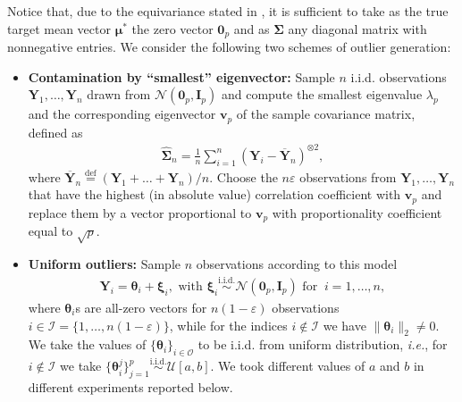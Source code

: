 \documentclass[aos,preprint,reqno]{imsart}
\newcommand\bmu{\boldsymbol\mu}
\newcommand\bxi{\boldsymbol\xi}
\newcommand\bSigma{\boldsymbol\Sigma}
\newcommand\bY{\boldsymbol Y}
\newcommand\bv{\boldsymbol v}
\newcommand\bfI{\mathbf I}
\newcommand\btheta{\boldsymbol\theta}
\theoremstyle{plain}
\theoremstyle{remark}
\begin{document}
    Notice that, due to the equivariance stated in 
    , it is sufficient to take as the true 
    target mean vector $\bmu^*$ the zero vector 
    $\mathbf{0}_p$ and as $\bSigma$ any  diagonal matrix 
    with nonnegative entries.  We consider the following 
    two schemes of outlier generation:
    \begin{itemize}
    \item {\textbf{Contamination by ``smallest'' eigenvector:}} Sample $n$ i.i.d. observations $\bY_1, \dots, \bY_n$ drawn from  $\mathcal{N}(\mathbf{0}_p, \bfI_p)$ and compute the smallest eigenvalue $\lambda_p$ and the corresponding eigenvector $\bv_p$ of the sample covariance matrix, defined as
    \begin{align}
        \widehat{\bSigma}_n = \frac 1 n \sum_{i=1}^n (\bY_i - 
        \overline{\bY}_n)^{\otimes 2},
    \end{align}
    where $\overline{\bY}_n \stackrel{\text{def}}{=} (\bY_1 + \dots + \bY_n) / n$. Choose the  ${n \varepsilon}$ observations from $\bY_1, \dots, \bY_n$ that have the highest (in absolute value) correlation coefficient with $\bv_p$ and replace them by a vector proportional to $\bv_p$ with proportionality coefficient equal to $\sqrt{p}$.
    \item \textbf{Uniform outliers:} Sample $n$ observations according to this model 
    \begin{align}
        \bY_i = \btheta_i + \bxi_i, \text{ with } \bxi_i \stackrel{\text{i.i.d.}}{\sim} \mathcal{N}(\mathbf{0}_p, \bfI_p) \text{ for } ~ i = 1, \dots, n,
    \end{align}
    where $\btheta_i$s are all-zero vectors for $n(1-\varepsilon)$ observations $i \in \mathcal I = \{1,\ldots,n (1 - \varepsilon)\}$, while for the indices $i \not\in \mathcal{I}$ we have $\| \btheta_i \|_2 \neq 0$. We take the values of $\{\btheta_i\}_{i\in\mathcal{O}}$ to be i.i.d. from uniform distribution, \textit{i.e.}, for $i \not\in \mathcal{I}$ we take $\{\btheta_i^j\}_{j=1}^p \stackrel{\text{i.i.d.}}{\sim}\mathcal{U}[a, b]$. We took different values of $a$ and $b$ in different experiments reported below. 
\end{itemize}
\end{document}
